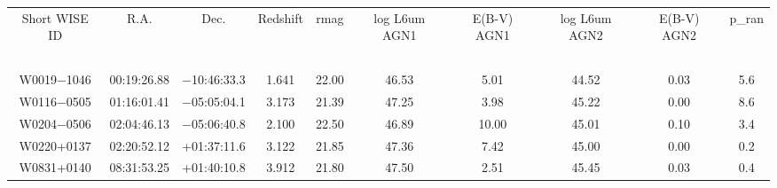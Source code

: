 \begin{table}
\begin{tabular}{cccccccccc}
Short WISE ID & R.A. & Dec. & Redshift & rmag & log L6um AGN1 & E(B-V) AGN1 & log L6um AGN2 & E(B-V) AGN2 & p_ran \\
 &  &  &  & $\mathrm{}$ &  &  &  &  &  \\
W0019$-$1046 & 00:19:26.88 & $-$10:46:33.3 & 1.641 & 22.00 & 46.53 & 5.01 & 44.52 & 0.03 & 5.6 \\
W0116$-$0505 & 01:16:01.41 & $-$05:05:04.1 & 3.173 & 21.39 & 47.25 & 3.98 & 45.22 & 0.00 & 8.6 \\
W0204$-$0506 & 02:04:46.13 & $-$05:06:40.8 & 2.100 & 22.50 & 46.89 & 10.00 & 45.01 & 0.10 & 3.4 \\
W0220+0137 & 02:20:52.12 & +01:37:11.6 & 3.122 & 21.85 & 47.36 & 7.42 & 45.00 & 0.00 & 0.2 \\
W0831+0140 & 08:31:53.25 & +01:40:10.8 & 3.912 & 21.80 & 47.50 & 2.51 & 45.45 & 0.03 & 0.4 \\
\end{tabular}
\end{table}
